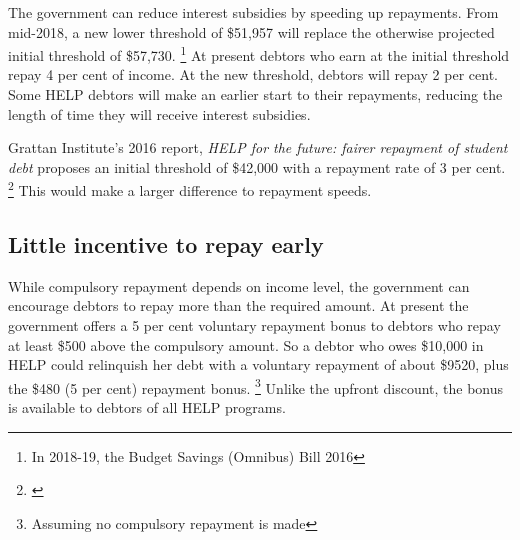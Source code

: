 \documentclass[embargoed]{grattan}
\begin{document}
The government can reduce interest subsidies by speeding up repayments.
From mid-2018, a new lower threshold of \$51,957 will replace the otherwise projected initial threshold of \$57,730.%
\footnote{In 2018-19, the Budget Savings (Omnibus) Bill 2016} At present debtors who earn at the initial threshold repay 4 per cent of income.
At the new threshold, debtors will repay 2 per cent.
Some \gls{HELP} debtors will make an earlier start to their repayments, reducing the length of time they will receive interest subsidies.

Grattan Institute's 2016 report, \emph{HELP for the future: fairer repayment of student debt} proposes an initial threshold of \$42,000 with a repayment rate of 3 per cent.%
\footnote{\textcite{Norton2016HELPfuturefairer}} This would make a larger difference to repayment speeds.

\subsection{Little incentive to repay early}\label{little-incentive-to-repay-early}

While compulsory repayment depends on income level, the government can encourage debtors to repay more than the required amount.
At present the government offers a 5 per cent voluntary repayment bonus to debtors who repay at least \$500 above the compulsory amount.
So a debtor who owes \$10,000 in \gls{HELP} could relinquish her debt with a voluntary repayment of about \$9520, plus the \$480 (5 per cent) repayment bonus.%
\footnote{Assuming no compulsory repayment is made} Unlike the upfront discount, the bonus is available to debtors of all \gls{HELP} programs.
\end{document}
